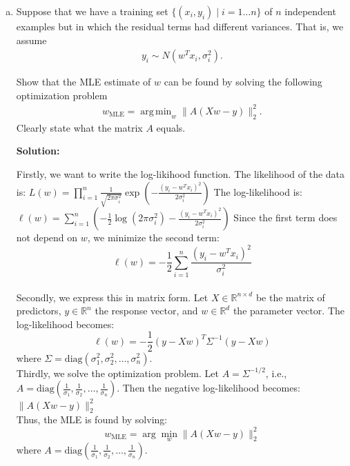 \documentclass{article}
\DeclareMathOperator*{\argmin}{arg\,min}
\newenvironment{solution}{\color{blue} \smallskip \textbf{Solution:}}{}
\begin{document}
\begin{enumerate}[(a)]
\begin{solution}
    \end{solution}

    \newpage
    \item %
    Suppose that we have a training set $\{(x_{i}, y_{i}) \mid i = 1 \ldots n\}$ of $n$ independent examples but in which the residual terms had different variances. That is, we assume
    \begin{align*}
        y_{i} \sim N(w^{T}x_{i}, \sigma_{i}^{2}).
    \end{align*}
    
    Show that the MLE estimate of $w$ can be found by solving the following optimization problem
    \begin{align*}
        w_{\text{MLE}} = \argmin_{w} \|A(Xw - y)\|_{2}^{2}.
    \end{align*}
    Clearly state what the matrix $A$ equals.
    
    \begin{solution}

Firstly, we want to write the log-likihood function. The likelihood of the data is:
\(
L(w) = \prod_{i=1}^{n} \frac{1}{\sqrt{2\pi \sigma_i^2}} \exp\left( -\frac{(y_i - w^T x_i)^2}{2 \sigma_i^2} \right)
\)
The log-likelihood is:
\(
\ell(w) = \sum_{i=1}^{n} \left( -\frac{1}{2} \log(2\pi \sigma_i^2) - \frac{(y_i - w^T x_i)^2}{2 \sigma_i^2} \right)
\)
Since the first term does not depend on \( w \), we minimize the second term:
\[
\ell(w) = -\frac{1}{2} \sum_{i=1}^{n} \frac{(y_i - w^T x_i)^2}{\sigma_i^2}
\]\\

Secondly, we express this in matrix form. Let \( X \in \mathbb{R}^{n \times d} \) be the matrix of predictors, \( y \in \mathbb{R}^n \) the response vector, and \( w \in \mathbb{R}^d \) the parameter vector. The log-likelihood becomes:
\[
\ell(w) = -\frac{1}{2} (y - Xw)^T \Sigma^{-1} (y - Xw)
\]
where \( \Sigma = \text{diag}(\sigma_1^2, \sigma_2^2, \dots, \sigma_n^2) \).\\

Thirdly, we solve the optimization problem. Let \( A = \Sigma^{-1/2} \), i.e., \( A = \text{diag}\left( \frac{1}{\sigma_1}, \frac{1}{\sigma_2}, \dots, \frac{1}{\sigma_n} \right) \). Then the negative log-likelihood becomes:
\(
\| A(Xw - y) \|_2^2
\)\\

Thus, the MLE is found by solving:
\[
w_{\text{MLE}} = \arg\min_w \| A(Xw - y) \|_2^2
\]
where \( A = \text{diag}\left( \frac{1}{\sigma_1}, \frac{1}{\sigma_2}, \dots, \frac{1}{\sigma_n} \right) \).





\end{solution}
\end{enumerate}
\end{document}
